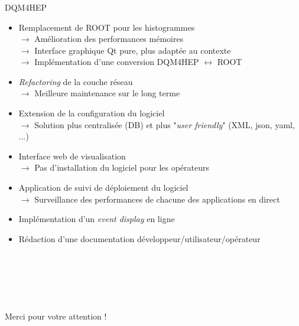\documentclass[8pt]{beamer}
\begin{document}
  \begin{frame}
  \frametitle{\secname}
  \framesubtitle{\subsecname}
    \begin{block}{DQM4HEP}
      \begin{itemize}
        \item Remplacement de ROOT pour les histogrammes \\
        $\rightarrow$ Amélioration des performances mémoires \\
        $\rightarrow$ Interface graphique Qt pure, plus adaptée au contexte \\
        $\rightarrow$ Implémentation d'une conversion DQM4HEP $\leftrightarrow$ ROOT
        \item \textit{Refactoring} de la couche réseau \\
        $\rightarrow$ Meilleure maintenance sur le long terme
        \item Extension de la configuration du logiciel \\
        $\rightarrow$ Solution plus centralisée (DB) et plus "\textit{user friendly}" (XML, json, yaml, ...)
        \item Interface web de visualisation \\
        $\rightarrow$ Pas d'installation du logiciel pour les opérateurs
        \item Application de suivi de déploiement du logiciel \\
        $\rightarrow$ Surveillance des performances de chacune des applications en direct
        \item Implémentation d'un \textit{event display} en ligne
        \item Rédaction d'une documentation développeur/utilisateur/opérateur
      \end{itemize}
    \end{block}
  \end{frame}

  \begin{frame}
    \begin{center}
      ~ \\
      ~ \\
      ~ \\
      ~ \\
      ~ \\
      \Large Merci pour votre attention !
    \end{center}
  \end{frame}
\end{document}
